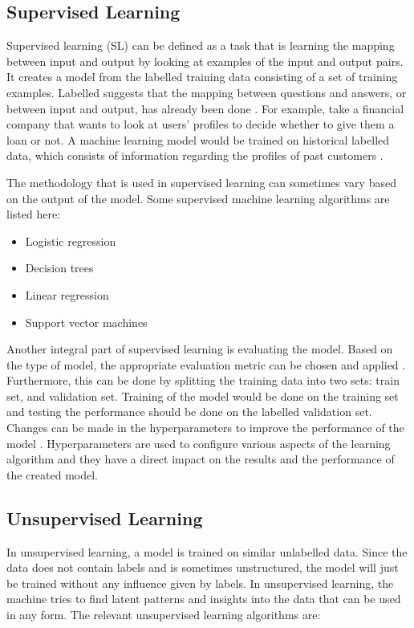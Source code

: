 \subsection{Supervised Learning}

Supervised learning (SL) can be defined as a task that is learning the mapping between input and output by looking at examples of the input and output pairs. It creates a model from the labelled training data consisting of a set of training examples. Labelled suggests that the mapping between questions and answers, or between input and output, has already been done \cite{singh2019natural}. For example, take a financial company that wants to look at users’ profiles to decide whether to give them a loan or not. A machine learning model would be trained on historical labelled data, which consists of information regarding the profiles of past customers \cite{kotsiantis2007supervised}. 

The methodology that is used in supervised learning can sometimes vary based on the output of the model. Some supervised machine learning algorithms are listed here:

\begin{itemize}
  \item Logistic regression
  \item Decision trees
  \item Linear regression
  \item Support vector machines
\end{itemize}

Another integral part of supervised learning is evaluating the model. Based on the type of model,  the appropriate evaluation metric can be chosen and applied \cite{sebastiani2002machine}. Furthermore, this can be done by splitting the training data into two sets: train set, and validation set. Training of the model would be done on the training set and testing the performance should be done on the labelled validation set. Changes can be made in the hyperparameters to improve the performance of the model \cite{kotsiantis2007supervised}. Hyperparameters are used to configure various aspects of the learning algorithm and they  have a direct impact on the results and the performance of the created model.

\subsection{Unsupervised Learning}

In unsupervised learning, a model is trained on similar unlabelled data. Since the data does not contain labels and is sometimes unstructured, the model will just be trained without any influence given by labels. In unsupervised learning, the machine tries to find latent patterns and insights into the data that can be used in any form. The relevant unsupervised learning algorithms are:

